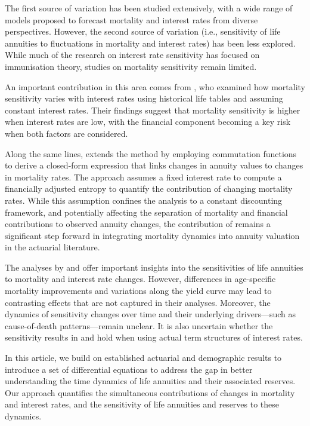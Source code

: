 \documentclass[12pt]{article}
\begin{document}
The first source of variation has been studied extensively, with a wide range of models proposed to forecast mortality and interest rates from diverse perspectives. However, the second source of variation (i.e., sensitivity of life annuities to fluctuations in mortality and interest rates) has been less explored. While much of the research on interest rate sensitivity has focused on immunisation theory, studies on mortality sensitivity remain limited.

An important contribution in this area comes from \citet{rabitti2020mortality}, who examined how mortality sensitivity varies with interest rates using historical life tables and assuming constant interest rates. Their findings suggest that mortality sensitivity is higher when interest rates are low, with the financial component becoming a key risk when both factors are considered. 
 
Along the same lines, \citet{di2025decomposing} extends the \citet{Vaupel2003} method by employing commutation functions to derive a closed-form expression that links changes in annuity values to changes in mortality rates. The approach assumes a fixed interest rate to compute a financially adjusted entropy to quantify the contribution of changing mortality rates. While this assumption confines the analysis to a constant discounting framework, and potentially affecting the separation of mortality and financial contributions to observed annuity changes, the contribution of \citet{di2025decomposing} remains a significant step forward in integrating mortality dynamics into annuity valuation in the actuarial literature.
 
The analyses by \citet{rabitti2020mortality} and \citet{di2025decomposing} offer important insights into the sensitivities of life annuities to mortality and interest rate changes. However, differences in age-specific mortality improvements and variations along the yield curve may lead to contrasting effects that are not captured in their analyses. Moreover, the dynamics of sensitivity changes over time and their underlying drivers—such as cause-of-death patterns—remain unclear. It is also uncertain whether the sensitivity results in \citet{rabitti2020mortality} and \citet{di2025decomposing} hold when using actual term structures of interest rates.
 

In this article, we build on established actuarial and demographic results to introduce a set of differential equations to address the gap in better understanding the time dynamics of life annuities and their associated reserves. Our approach quantifies the simultaneous contributions of changes in mortality and interest rates, and the sensitivity of life annuities and reserves to these dynamics.
\end{document}
